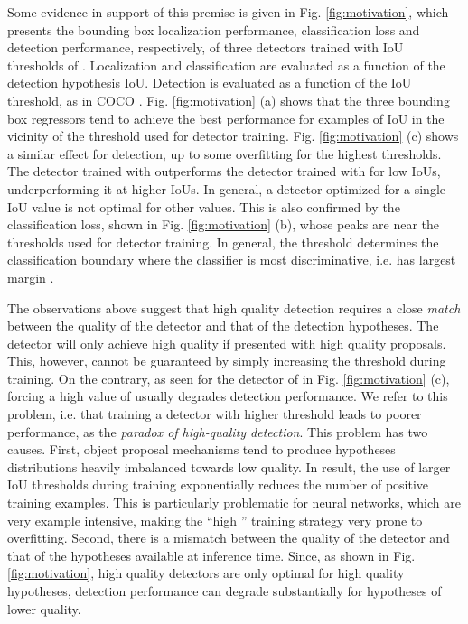 \documentclass[10pt,journal,compsoc]{IEEEtran}
\begin{document}
Some evidence in support of this premise is given in Fig.
\ref{fig:motivation}, which presents the bounding box localization
performance, classification loss and detection performance, respectively, of
three detectors trained with IoU thresholds of . Localization
and classification are evaluated as a function of the detection hypothesis
IoU. Detection is evaluated as a function of
the IoU threshold, as in COCO \cite{DBLP:conf/eccv/LinMBHPRDZ14}.
Fig. \ref{fig:motivation} (a)
shows that the three bounding box regressors tend to achieve the best
performance for examples of IoU in the vicinity of the threshold used for
detector training. Fig. \ref{fig:motivation} (c) shows a similar effect
for detection, up to some overfitting for the highest thresholds.
The detector trained with 
outperforms the detector trained with  for low IoUs,
underperforming it at higher IoUs. In general, a detector optimized for
a single IoU value is not optimal for other values. This is also confirmed by
the classification loss, shown in Fig. \ref{fig:motivation} (b), whose
peaks are near the thresholds used for
detector training. In general, the threshold determines the classification
boundary where the classifier is most discriminative, i.e. has largest
margin \cite{DBLP:journals/ml/CortesV95,DBLP:conf/eurocolt/FreundS95}.

The observations above suggest that high quality detection requires a
close {\it match\/} between the quality of the detector and that of the
detection hypotheses. The detector will only achieve high quality if
presented with high quality proposals. This, however, cannot be guaranteed
by simply increasing the threshold  during training. On the contrary,
as seen for the detector of  in Fig. \ref{fig:motivation} (c),
forcing a high value of  usually degrades detection performance.
We refer to this problem, i.e. that training a detector with higher
threshold leads to poorer performance, as the {\it paradox of
high-quality detection\/}. This problem has two causes. First, object
proposal mechanisms tend to produce  hypotheses distributions
heavily imbalanced towards low quality. In result, the use of larger
IoU thresholds during training exponentially reduces the number of positive
training examples. This is particularly problematic for neural networks,
which are very example intensive, making the ``high '' training strategy
very prone to overfitting. Second, there is a mismatch between the quality
of the detector and that of the hypotheses available
at inference time. Since, as shown in Fig. \ref{fig:motivation}, high
quality detectors are only optimal for high quality hypotheses, detection
performance can degrade substantially for hypotheses of lower quality.
\end{document}
